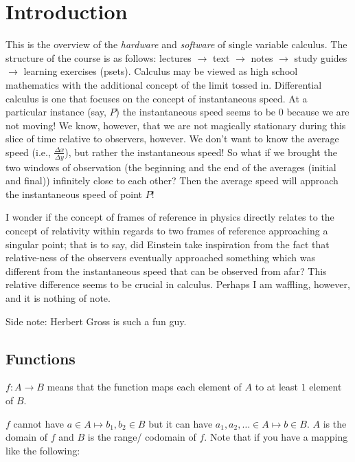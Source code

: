 \documentclass{article}
\begin{document}

\section{Introduction}

This is the overview of the \textit{hardware} and \textit{software} of single variable calculus. The structure of the course is as follows: lectures $\longrightarrow $ text \( \longrightarrow  \) notes \( \longrightarrow  \) study guides \( \longrightarrow  \) learning exercises (psets). Calculus may be viewed as high school mathematics with the additional concept of the limit tossed in. Differential calculus is one that focuses on the concept of instantaneous speed. At a particular instance (say, \( P \)) the instantaneous speed seems to be $0$ because we are not moving! We know, however, that we are not magically stationary during this slice of time relative to observers, however. We don't want to know the average speed (i.e., \( \frac{\Delta x}{\Delta y} \)), but rather the instantaneous speed! So what if we brought the two windows of observation (the beginning and the end of the averages (initial and final)) infinitely close to each other? Then the average speed will approach the instantaneous speed of point \( P \)!

I wonder if the concept of frames of reference in physics directly relates to the concept of relativity within regards to two frames of reference approaching a singular point; that is to say, did Einstein take inspiration from the fact that relative-ness of the observers eventually approached something which was different from the instantaneous speed that can be observed from afar? This relative difference seems to be crucial in calculus. Perhaps I am waffling, however, and it is nothing of note. 

Side note: Herbert Gross is such a fun guy.

\subsection{Functions}

\begin{definition}
$f:A \to B$ means that the function maps each element of $A$ to at least $1$ element of $B$.\end{definition}

 $f$ cannot have $a\in A \mapsto b_{1},b_{2}\in B$ but it can have   $a_{1},a_{2},\ldots \in A \mapsto b \in B$. $A$ is the domain of $f$ and $B$ is the range/ codomain of $f$. Note that if you have a mapping like the following:
\end{document}
